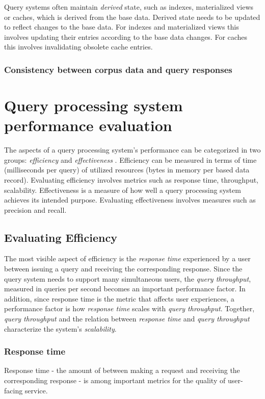 Query systems often maintain \textit{derived} state, such as indexes, materialized views or caches, which is
derived from the base data.
Derived state needs to be updated to reflect changes to the base data.
For indexes and materialized views this involves updating their entries according to the base data changes.
For caches this involves invalidating obsolete cache entries.


\subsubsection{Consistency between corpus data and query responses}

\section{Query processing system performance evaluation}
\label{sec:requirements}

The aspects of a query processing system's performance can be categorized in two groups:
\textit{efficiency} and \textit{effectiveness} \cite{buttcher:informationretrieval}.
Efficiency can be measured in terms of time (milliseconds per query) of utilized resources (bytes in memory per based
data record).
Evaluating efficiency involves metrics such as response time, throughput, scalability.
Effectiveness is a measure of how well a query processing system achieves its intended purpose.
Evaluating effectiveness involves measures such as precision and recall.

\subsection{Evaluating Efficiency}

The most visible aspect of efficiency is the \textit{response time} experienced by a user between issuing a query and
receiving the corresponding response.
Since the query system needs to support many simultaneous users, the \textit{query throughput}, measured in queries per
second becomes an important performance factor.
In addition, since response time is the metric that affects user experiences, a performance factor is how
\textit{response time} scales with \textit{query throughput}.
Together, \textit{query throughput} and the relation between \textit{response time} and \textit{query throughput}
characterize the system's \textit{scalability}.

\subsubsection{Response time}
Response time - the amount of between making a request and receiving the corresponding response -
is among important metrics for the quality of user-facing service.

